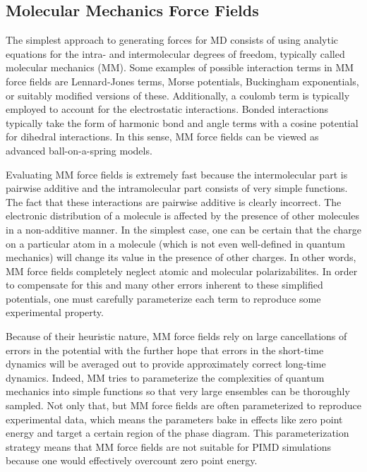 \documentclass[11pt, proquest]{uwthesis}[2020/02/24]
\begin{document}
\subsection{Molecular Mechanics Force Fields}
The simplest approach to generating forces for MD consists of using analytic equations for the intra- and intermolecular degrees of freedom, typically called molecular mechanics (MM). Some examples of possible interaction terms in MM force fields are Lennard-Jones terms\autocite{jones_determination_1924,jones_determination_1924-1}, Morse potentials\autocite{morse_diatomic_1929}, Buckingham exponentials\autocite{buckingham_classical_1938}, or suitably modified versions of these\autocite{werhahn_new_2015}. Additionally, a coulomb term is typically employed to account for the electrostatic interactions. Bonded interactions typically take the form of harmonic bond and angle terms with a cosine potential for dihedral interactions. In this sense, MM force fields can be viewed as advanced ball-on-a-spring models.

\par Evaluating MM force fields is extremely fast because the intermolecular part is pairwise additive and the intramolecular part consists of very simple functions. The fact that these interactions are pairwise additive is clearly incorrect. The electronic distribution of a molecule is affected by the presence of other molecules in a non-additive manner\autocite{stone_theory_2013}. In the simplest case, one can be certain that the charge on a particular atom in a molecule (which is not even well-defined in quantum mechanics) will change its value in the presence of other charges. In other words, MM force fields completely neglect atomic and molecular polarizabilites. In order to compensate for this and many other errors inherent to these simplified potentials, one must carefully parameterize each term to reproduce some experimental property.

\par Because of their heuristic nature, MM force fields rely on large cancellations of errors in the potential with the further hope that errors in the short-time dynamics will be averaged out to provide approximately correct long-time dynamics. Indeed, MM tries to parameterize the complexities of quantum mechanics into simple functions so that very large ensembles can be thoroughly sampled. Not only that, but MM force fields are often parameterized to reproduce experimental data, which means the parameters bake in effects like zero point energy and target a certain region of the phase diagram. This parameterization strategy means that MM force fields are not suitable for PIMD simulations because one would effectively overcount zero point energy.
\end{document}

